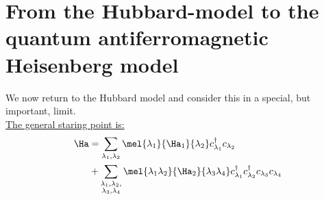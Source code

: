 \section{From the Hubbard-model to the quantum antiferromagnetic Heisenberg model}

We now return to the Hubbard model and consider this in a special, but important, limit.\\

\underline{The general staring point is:}
\begin{align}
\begin{split}
    \Ha &= \sum_{\lambda_1,\lambda_2} \mel{\lambda_1}{\Ha_1}{\lambda_2}c_{\lambda_1}^{\dagger} c_{\lambda_2} \\
    &+ \sum_{\substack{\lambda_1, \lambda_2, \\
    \lambda_3, \lambda_4}} \mel{\lambda_1 \lambda_2}{\Ha_2}{\lambda_3 \lambda_4}c_{\lambda_1}^\dagger c_{\lambda_2}^\dagger c_{\lambda_3} c_{\lambda_4}
\end{split}
\end{align}


